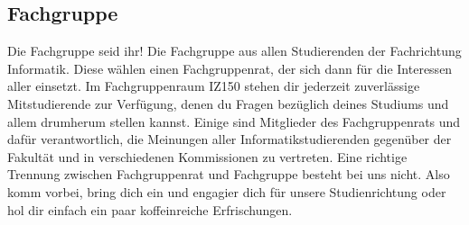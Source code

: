 
\subsection{Fachgruppe}
	\label{fachgruppe}
	Die Fachgruppe seid ihr! Die Fachgruppe aus allen Studierenden der Fachrichtung Informatik. Diese wählen einen Fachgruppenrat, der sich dann für die Interessen aller einsetzt. 
	Im Fachgruppenraum IZ150 stehen dir jederzeit zuverlässige Mitstudierende zur Verfügung, denen du Fragen bezüglich deines Studiums und allem drumherum stellen kannst. Einige sind Mitglieder des Fachgruppenrats und dafür verantwortlich, die Meinungen aller Informatikstudierenden gegenüber der Fakultät und in verschiedenen Kommissionen zu vertreten. Eine richtige Trennung zwischen Fachgruppenrat und Fachgruppe besteht bei uns nicht. Also komm vorbei, bring dich ein und engagier dich für unsere Studienrichtung oder hol dir einfach ein paar koffeinreiche Erfrischungen. 
